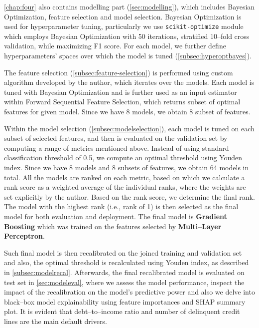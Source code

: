 \autoref{chap:four} also contains modelling part (\autoref{sec:modelling}), which includes Bayesian Optimization, feature selection and model selection.
Bayesian Optimization is used for hyperparameter tuning, particularly we use \lstinline{scikit-optimize} module which employs Bayesian Optimization with 50 iterations, stratified 10--fold cross validation, while maximizing F1 score. For each model, we further define hyperparameters' spaces over which the model is tuned (\autoref{subsec:hyperoptbayes}).

The feature selection (\autoref{subsec:feature-selection}) is performed using custom algorithm developed by the author, which iterates over the models. Each model is tuned with Bayesian Optimization and is further used as an input estimator within Forward Sequential Feature Selection, which returns subset of optimal features for given model. Since we have 8 models, we obtain 8 subset of features.

Within the model selection (\autoref{subsec:modelselection}), each model is tuned on each subset of selected features, and then is evaluated on the validation set by computing a range of metrics mentioned above.
Instead of using standard classification threshold of 0.5, we compute an optimal threshold using Youden index. Since we have 8 models and 8 subsets of features, we obtain 64 models in total.
All the models are ranked on each metric, based on which we calculate a rank score as a weighted average of the individual ranks, where the weights are set explicitly by the author. Based on the rank score, we determine the final rank. The model with the highest rank (i.e., rank of 1) is then selected as the final model for both evaluation and deployment.
The final model is \textbf{Gradient Boosting} which was trained on the features selected by \textbf{Multi--Layer Perceptron}.

\newpage
Such final model is then recalibrated on the joined training and validation set and also, the optimal threshold is recalculated using Youden index, as described in \autoref{subsec:modelrecal}.
Afterwards, the final recalibrated model is evaluated on test set in \autoref{sec:modeleval}, where we assess the model performance, inspect the impact of the recalibration on the model's predictive power and also we delve into black--box model explainability using feature importances and SHAP summary plot. It is evident that debt--to--income ratio and number of delinquent credit lines are the main default drivers.

